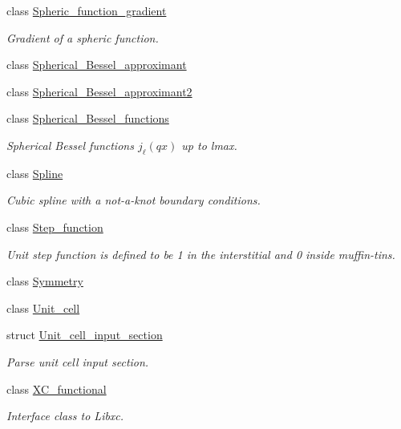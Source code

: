 \begin{DoxyCompactItemize}
class \hyperlink{classsirius_1_1_spheric__function__gradient}{Spheric\+\_\+function\+\_\+gradient}
\begin{DoxyCompactList}\small\item\em Gradient of a spheric function. \end{DoxyCompactList}\item 
class \hyperlink{classsirius_1_1_spherical___bessel__approximant}{Spherical\+\_\+\+Bessel\+\_\+approximant}
\item 
class \hyperlink{classsirius_1_1_spherical___bessel__approximant2}{Spherical\+\_\+\+Bessel\+\_\+approximant2}
\item 
class \hyperlink{classsirius_1_1_spherical___bessel__functions}{Spherical\+\_\+\+Bessel\+\_\+functions}
\begin{DoxyCompactList}\small\item\em Spherical Bessel functions $ j_{\ell}(q x) $ up to lmax. \end{DoxyCompactList}\item 
class \hyperlink{classsirius_1_1_spline}{Spline}
\begin{DoxyCompactList}\small\item\em Cubic spline with a not-\/a-\/knot boundary conditions. \end{DoxyCompactList}\item 
class \hyperlink{classsirius_1_1_step__function}{Step\+\_\+function}
\begin{DoxyCompactList}\small\item\em Unit step function is defined to be 1 in the interstitial and 0 inside muffin-\/tins. \end{DoxyCompactList}\item 
class \hyperlink{classsirius_1_1_symmetry}{Symmetry}
\item 
class \hyperlink{classsirius_1_1_unit__cell}{Unit\+\_\+cell}
\item 
struct \hyperlink{structsirius_1_1_unit__cell__input__section}{Unit\+\_\+cell\+\_\+input\+\_\+section}
\begin{DoxyCompactList}\small\item\em Parse unit cell input section. \end{DoxyCompactList}\item 
class \hyperlink{classsirius_1_1_x_c__functional}{X\+C\+\_\+functional}
\begin{DoxyCompactList}\small\item\em Interface class to Libxc. \end{DoxyCompactList}\end{DoxyCompactItemize}
